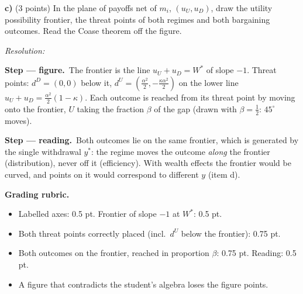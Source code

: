 \documentclass[11pt,a4paper]{article}
\newif\ifsolucoes
\newcommand{\espacoresol}{5cm}   %
\newcommand{\resolespaco}{\ifsolucoes\else\par\textit{Resolution:}\vspace{\espacoresol}\par\fi}
\newcommand{\passo}[2]{\par\smallskip\noindent\textbf{Step --- #1.}~#2}
\newcommand{\refbib}[1]{\par\smallskip\noindent{\footnotesize\color{black!60}\textbf{Ref:} #1}}
\newcommand{\rubrica}[1]{\par\smallskip\noindent\textbf{Grading rubric.}\begin{itemize}[leftmargin=1.4em,topsep=1pt]#1\end{itemize}}
\begin{document}
\textbf{c)} (3 points) In the plane of payoffs net of $m_i$, $(u_U,u_D)$, draw the utility
possibility frontier, the threat points of both regimes and both bargaining outcomes. Read the
Coase theorem off the figure.
\resolespaco
\begin{sol}
\passo{figure}{The frontier is the line $u_U+u_D=W^*$ of slope $-1$. Threat points:
$d^D=(0,0)$ below it, $d^U=(\tfrac{\alpha^2}2,-\tfrac{\kappa\alpha^2}2)$ on the lower line
$u_U+u_D=\tfrac{\alpha^2}2(1-\kappa)$. Each outcome is reached from its threat point by moving
onto the frontier, $U$ taking the fraction $\beta$ of the gap (drawn with $\beta=\tfrac12$:
$45^\circ$ moves).}
\begin{center}
\end{center}
\passo{reading}{Both outcomes lie on the same frontier, which is generated by the single
withdrawal $y^*$: the regime moves the outcome \emph{along} the frontier (distribution), never
off it (efficiency). With wealth effects the frontier would be curved, and points on it would
correspond to different $y$ (item d).}
\refbib{M\&R Ch.~2, Figure 2.1, p.~37.}
\rubrica{
\item Labelled axes: 0.5 pt. Frontier of slope $-1$ at $W^*$: 0.5 pt.
\item Both threat points correctly placed (incl.\ $d^U$ below the frontier): 0.75 pt.
\item Both outcomes on the frontier, reached in proportion $\beta$: 0.75 pt. Reading: 0.5 pt.
\item A figure that contradicts the student's algebra loses the figure points.
}
\end{sol}
\end{document}
